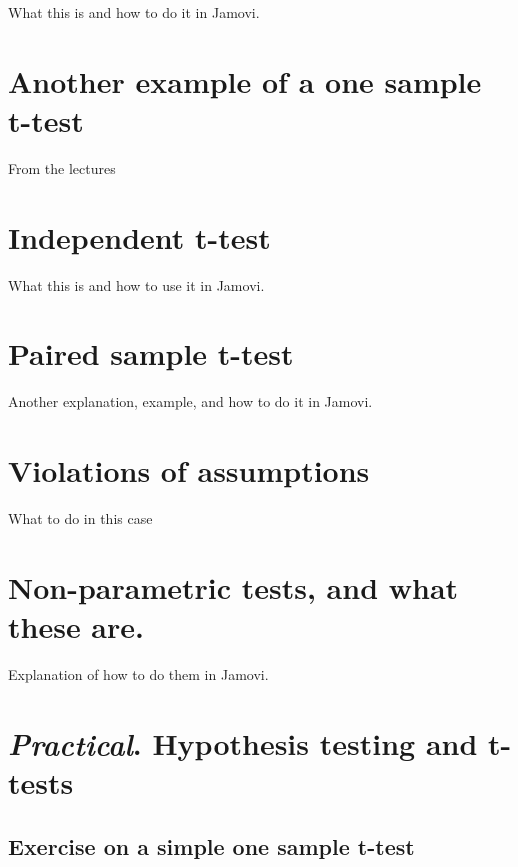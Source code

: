 \documentclass[
]{book}
\begin{document}
What this is and how to do it in Jamovi.

\hypertarget{another-example-of-a-one-sample-t-test}{%
\chapter{Another example of a one sample t-test}\label{another-example-of-a-one-sample-t-test}}

From the lectures

\hypertarget{independent-t-test}{%
\chapter{Independent t-test}\label{independent-t-test}}

What this is and how to use it in Jamovi.

\hypertarget{paired-sample-t-test}{%
\chapter{Paired sample t-test}\label{paired-sample-t-test}}

Another explanation, example, and how to do it in Jamovi.

\hypertarget{violations-of-assumptions}{%
\chapter{Violations of assumptions}\label{violations-of-assumptions}}

What to do in this case

\hypertarget{non-parametric-tests-and-what-these-are.}{%
\chapter{Non-parametric tests, and what these are.}\label{non-parametric-tests-and-what-these-are.}}

Explanation of how to do them in Jamovi.

\hypertarget{practical.-hypothesis-testing-and-t-tests}{%
\chapter{\texorpdfstring{\emph{Practical}. Hypothesis testing and t-tests}{Practical. Hypothesis testing and t-tests}}\label{practical.-hypothesis-testing-and-t-tests}}

\hypertarget{exercise-on-a-simple-one-sample-t-test}{%
\section{Exercise on a simple one sample t-test}\label{exercise-on-a-simple-one-sample-t-test}}
\end{document}
